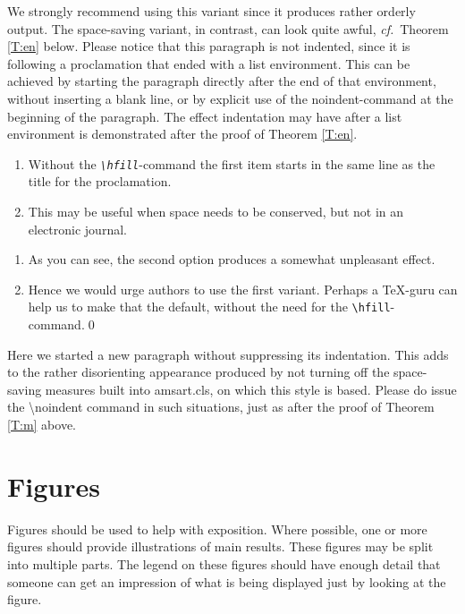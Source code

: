 \documentclass{jpc} %
\theoremstyle{plain}\newtheorem{satz}[thm]{Satz} %
\def\cf{{\em cf.}}
\begin{document}
  \noindent We strongly recommend using this variant since it produces
  rather orderly output.  The space-saving variant, in contrast, can
  look quite awful, \cf~Theorem \ref{T:en} below.  Please notice that
  this paragraph is not indented, since it is following a proclamation
  that ended with a list environment.  This can be achieved by
  starting the paragraph directly after the end of that environment,
  without inserting a blank line, or by explicit use of the
  noindent-command at the beginning of the paragraph.  The effect
  indentation may have after a list environment is demonstrated after
  the proof of Theorem \ref{T:en}. 
 
\begin{thm}\label{T:en} %

\begin{enumerate}%
\item  
  Without the \emph{\texttt{\textbackslash hfill}}-command the first item
  starts in the same line as the title for the proclamation.
\item
  This may be useful when space needs to be conserved, but not in an
  electronic journal.
\end{enumerate}
\end{thm}

\proof %
\begin{enumerate}%
\item
  As you can see, the second option produces a somewhat unpleasant effect.
\item
  Hence we would urge authors to use the first variant.  Perhaps a
  \TeX-guru can help us to make that the default, without the need for
  the \texttt{\textbackslash hfill}-command.\qed
\end{enumerate}

  Here we started a new paragraph without suppressing its
  indentation.  This adds to the rather disorienting appearance
  produced by not turning off the space-saving measures built into
  amsart.cls, on which this style is based.  Please do issue the
  \hbox{\textbackslash noindent} command in such situations, just as
  after the proof of Theorem \ref{T:m} above.

\section{Figures}
Figures should be used to help with exposition. Where possible, one or more figures should provide illustrations of main results. These figures may be split into multiple parts. The legend on these figures should have enough detail that someone can get an impression of what is being displayed just by looking at the figure.
\end{document}
